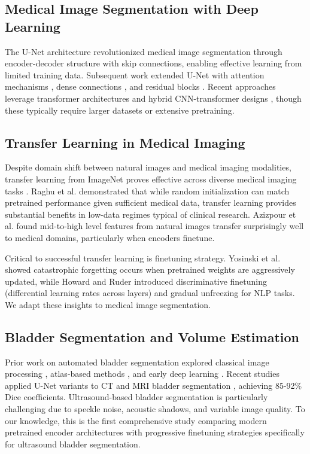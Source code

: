 \documentclass{article}
\begin{document}
\subsection{Medical Image Segmentation with Deep Learning}

The U-Net architecture \cite{ronneberger2015unet} revolutionized medical image segmentation through encoder-decoder structure with skip connections, enabling effective learning from limited training data. Subsequent work extended U-Net with attention mechanisms \cite{oktay2018attention}, dense connections \cite{huang2017densely}, and residual blocks \cite{zhang2018road}. Recent approaches leverage transformer architectures \cite{chen2021transunet} and hybrid CNN-transformer designs \cite{hatamizadeh2022unetr}, though these typically require larger datasets or extensive pretraining.

\subsection{Transfer Learning in Medical Imaging}

Despite domain shift between natural images and medical imaging modalities, transfer learning from ImageNet proves effective across diverse medical imaging tasks \cite{tajbakhsh2016convolutional,ravishankar2016understanding}. Raghu et al. \cite{raghu2019transfusion} demonstrated that while random initialization can match pretrained performance given sufficient medical data, transfer learning provides substantial benefits in low-data regimes typical of clinical research. Azizpour et al. \cite{azizpour2015factors} found mid-to-high level features from natural images transfer surprisingly well to medical domains, particularly when encoders finetune.

Critical to successful transfer learning is finetuning strategy. Yosinski et al. \cite{yosinski2014transferable} showed catastrophic forgetting occurs when pretrained weights are aggressively updated, while Howard and Ruder \cite{howard2018universal} introduced discriminative finetuning (differential learning rates across layers) and gradual unfreezing for NLP tasks. We adapt these insights to medical image segmentation.

\subsection{Bladder Segmentation and Volume Estimation}

Prior work on automated bladder segmentation explored classical image processing \cite{li2009automated}, atlas-based methods \cite{wang2015atlas}, and early deep learning \cite{ma2017bladder}. Recent studies applied U-Net variants to CT \cite{chen2019automatic} and MRI bladder segmentation \cite{dolz20183d}, achieving 85-92\% Dice coefficients. Ultrasound-based bladder segmentation is particularly challenging due to speckle noise, acoustic shadows, and variable image quality. To our knowledge, this is the first comprehensive study comparing modern pretrained encoder architectures with progressive finetuning strategies specifically for ultrasound bladder segmentation.
\end{document}
